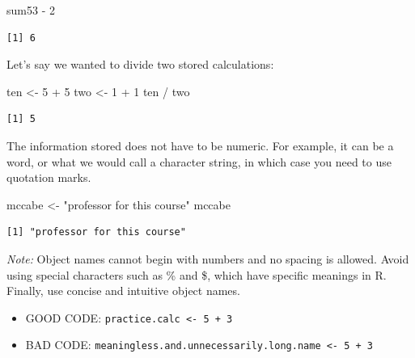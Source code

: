 \documentclass[
  letterpaper,
  DIV=11,
  numbers=noendperiod]{scrreprt}
\newenvironment{Shaded}{\begin{snugshade}}{\end{snugshade}}
\newcommand{\DecValTok}[1]{\textcolor[rgb]{0.68,0.00,0.00}{#1}}
\newcommand{\NormalTok}[1]{\textcolor[rgb]{0.00,0.23,0.31}{#1}}
\newcommand{\OtherTok}[1]{\textcolor[rgb]{0.00,0.23,0.31}{#1}}
\newcommand{\SpecialCharTok}[1]{\textcolor[rgb]{0.37,0.37,0.37}{#1}}
\newcommand{\StringTok}[1]{\textcolor[rgb]{0.13,0.47,0.30}{#1}}
\providecommand{\tightlist}{%
  \setlength{\itemsep}{0pt}\setlength{\parskip}{0pt}}\usepackage{longtable,booktabs,array}
\begin{document}
\begin{Shaded}
\begin{Highlighting}[]
\NormalTok{sum53 }\SpecialCharTok{{-}} \DecValTok{2}
\end{Highlighting}
\end{Shaded}

\begin{verbatim}
[1] 6
\end{verbatim}

Let's say we wanted to divide two stored calculations:

\begin{Shaded}
\begin{Highlighting}[]
\NormalTok{ten }\OtherTok{\textless{}{-}} \DecValTok{5} \SpecialCharTok{+} \DecValTok{5}
\NormalTok{two }\OtherTok{\textless{}{-}} \DecValTok{1} \SpecialCharTok{+} \DecValTok{1}
\NormalTok{ten }\SpecialCharTok{/}\NormalTok{ two}
\end{Highlighting}
\end{Shaded}

\begin{verbatim}
[1] 5
\end{verbatim}

The information stored does not have to be numeric. For example, it can
be a word, or what we would call a character string, in which case you
need to use quotation marks.

\begin{Shaded}
\begin{Highlighting}[]
\NormalTok{mccabe }\OtherTok{\textless{}{-}} \StringTok{"professor for this course"}
\NormalTok{mccabe}
\end{Highlighting}
\end{Shaded}

\begin{verbatim}
[1] "professor for this course"
\end{verbatim}

\emph{Note:} Object names cannot begin with numbers and no spacing is
allowed. Avoid using special characters such as \% and \$, which have
specific meanings in R. Finally, use concise and intuitive object names.

\begin{itemize}
\tightlist
\item
  GOOD CODE: \texttt{practice.calc\ \textless{}-\ 5\ +\ 3}
\item
  BAD CODE:
  \texttt{meaningless.and.unnecessarily.long.name\ \textless{}-\ 5\ +\ 3}
\end{itemize}
\end{document}

